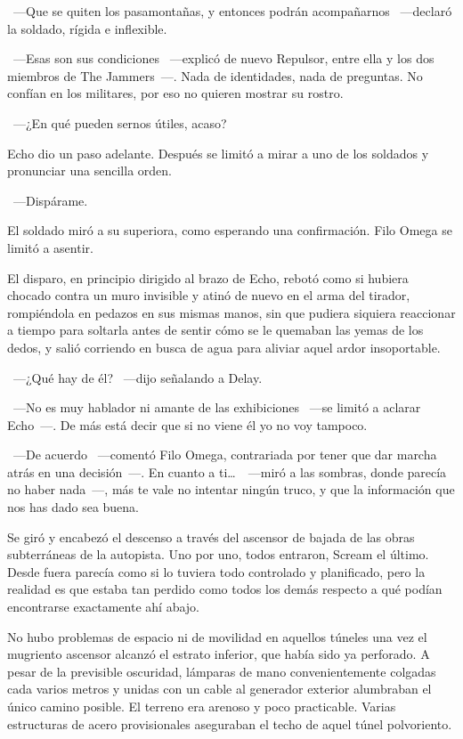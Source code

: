 ~---Que se quiten los pasamontañas, y entonces podrán acompañarnos ~---declaró la soldado, rígida e inflexible.

~---Esas son sus condiciones ~---explicó de nuevo Repulsor, entre ella y los dos miembros de The Jammers~---. Nada de identidades, nada de preguntas. No confían en los militares, por eso no quieren mostrar su rostro.

~---¿En qué pueden sernos útiles, acaso?

Echo dio un paso adelante. Después se limitó a mirar a uno de los soldados y pronunciar una sencilla orden.

~---Dispárame.

El soldado miró a su superiora, como esperando una confirmación. Filo Omega se limitó a asentir.

El disparo, en principio dirigido al brazo de Echo, rebotó como si hubiera chocado contra un muro invisible y atinó de nuevo en el arma del tirador, rompiéndola en pedazos en sus mismas manos, sin que pudiera siquiera reaccionar a tiempo para soltarla antes de sentir cómo se le quemaban las yemas de los dedos, y salió corriendo en busca de agua para aliviar aquel ardor insoportable.

~---¿Qué hay de él? ~---dijo señalando a Delay.

~---No es muy hablador ni amante de las exhibiciones ~---se limitó a aclarar Echo~---. De más está decir que si no viene él yo no voy tampoco.

~---De acuerdo ~---comentó Filo Omega, contrariada por tener que dar marcha atrás en una decisión~---. En cuanto a ti\dots\ ~---miró a las sombras, donde parecía no haber nada~---, más te vale no intentar ningún truco, y que la información que nos has dado sea buena.

Se giró y encabezó el descenso a través del ascensor de bajada de las obras subterráneas de la autopista. Uno por uno, todos entraron, Scream el último. Desde fuera parecía como si lo tuviera todo controlado y planificado, pero la realidad es que estaba tan perdido como todos los demás respecto a qué podían encontrarse exactamente ahí abajo.

No hubo problemas de espacio ni de movilidad en aquellos túneles una vez el mugriento ascensor alcanzó el estrato inferior, que había sido ya perforado. A pesar de la previsible oscuridad, lámparas de mano convenientemente colgadas cada varios metros y unidas con un cable al generador exterior alumbraban el único camino posible. El terreno era arenoso y poco practicable. Varias estructuras de acero provisionales aseguraban el techo de aquel túnel polvoriento.

